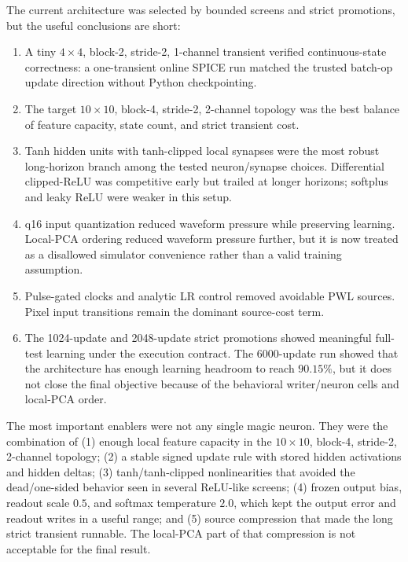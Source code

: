 \documentclass[11pt]{article}
\begin{document}
The current architecture was selected by bounded screens and strict promotions,
but the useful conclusions are short:
\begin{enumerate}
  \item A tiny \(4\times4\), block-2, stride-2, 1-channel transient verified
    continuous-state correctness: a one-transient online SPICE run matched the
    trusted batch-op update direction without Python checkpointing.
  \item The target \(10\times10\), block-4, stride-2, 2-channel topology was
    the best balance of feature capacity, state count, and strict transient
    cost.
  \item Tanh hidden units with tanh-clipped local synapses were the most robust
    long-horizon branch among the tested neuron/synapse choices.  Differential
    clipped-ReLU was competitive early but trailed at longer horizons; softplus
    and leaky ReLU were weaker in this setup.
  \item q16 input quantization reduced waveform pressure while preserving
    learning.  Local-PCA ordering reduced waveform pressure further, but it is
    now treated as a disallowed simulator convenience rather than a valid
    training assumption.
  \item Pulse-gated clocks and analytic LR control removed avoidable PWL
    sources.  Pixel input transitions remain the dominant source-cost term.
  \item The 1024-update and 2048-update strict promotions showed meaningful
    full-test learning under the execution contract.  The 6000-update run
    showed that the architecture has enough learning headroom to reach
    \(90.15\%\), but it does not close the final objective because of the
    behavioral writer/neuron cells and local-PCA order.
\end{enumerate}

The most important enablers were not any single magic neuron.  They were the
combination of (1) enough local feature capacity in the \(10\times10\),
block-4, stride-2, 2-channel topology; (2) a stable signed update rule with
stored hidden activations and hidden deltas; (3) tanh/tanh-clipped nonlinearities
that avoided the dead/one-sided behavior seen in several ReLU-like screens;
(4) frozen output bias, readout scale \(0.5\), and softmax temperature \(2.0\),
which kept the output error and readout writes in a useful range; and (5) source
compression that made the long strict transient runnable.  The local-PCA part
of that compression is not acceptable for the final result.
\end{document}
